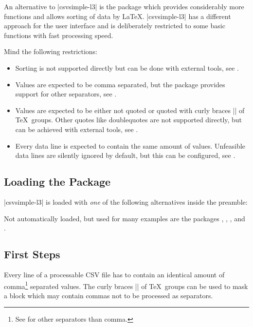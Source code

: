 \documentclass[a4paper,11pt]{ltxdoc}
\begin{document}
An alternative to |csvsimple-l3| is the  package
which provides considerably more functions and allows sorting of data by \LaTeX.
|csvsimple-l3| has a different approach for the user interface and
is deliberately restricted to some basic functions with fast
processing speed.

Mind the following restrictions:
\begin{itemize}
\item Sorting is not supported directly but can be done
  with external tools, see .
\item Values are expected to be comma separated, but the package
  provides support for other separators, see .
\item Values are expected to be either not quoted or quoted with
  curly braces |{}| of \TeX\ groups. Other quotes like doublequotes
  are not supported directly, but can be achieved
  with external tools, see .
\item Every data line is expected to contain the same amount of values.
  Unfeasible data lines are silently ignored by default, but this can
  be configured, see .
\end{itemize}


\subsection{Loading the Package}
|csvsimple-l3| is loaded with \emph{one} of the following
alternatives inside the preamble:
\begin{dispListing}
\usepackage[l3]{csvsimple}
\usepackage{csvsimple-l3}
\end{dispListing}

Not automatically loaded, but used for many examples are the packages
, , , and .


\clearpage
\subsection{First Steps}
Every line of a processable CSV file has to contain an identical amount of
comma\footnote{See  for other separators than comma.} separated values. The curly braces |{}| of \TeX\ groups can be used
to mask a block which may contain commas not to be processed as separators.
\end{document}
